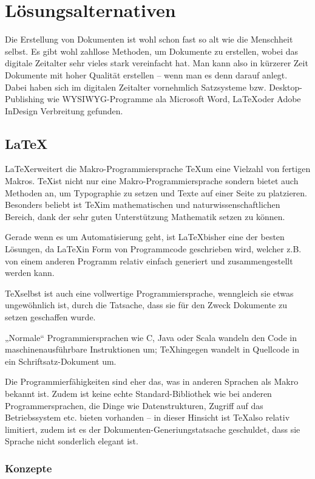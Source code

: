 \chapter{Lösungsalternativen}

Die Erstellung von Dokumenten ist wohl schon fast so alt wie die Menschheit
selbst. Es gibt wohl zahllose Methoden, um Dokumente zu erstellen, wobei
das digitale Zeitalter sehr vieles stark vereinfacht hat. Man kann also
in kürzerer Zeit Dokumente mit hoher Qualität erstellen -- wenn man es
denn darauf anlegt. Dabei haben sich im digitalen Zeitalter vornehmlich
Satzsysteme bzw. Desktop-Publishing wie WYSIWYG-Programme
ala Microsoft Word, \LaTeX oder Adobe InDesign Verbreitung gefunden.

\section{\LaTeX}

\LaTeX erweitert die Makro-Programmiersprache \TeX um eine Vielzahl von
fertigen Makros. \TeX ist nicht nur eine Makro-Programmiersprache sondern
bietet auch Methoden an, um Typographie zu setzen und Texte auf einer Seite
zu platzieren. Besonders beliebt ist \TeX im mathematischen und
naturwissenschaftlichen Bereich, dank der sehr guten Unterstützung Mathematik
setzen zu können.

Gerade wenn es um Automatisierung geht, ist \LaTeX bisher eine der besten
Lösungen, da \LaTeX in Form von Programmcode geschrieben wird, welcher
z.B. von einem anderen Programm relativ einfach generiert und zusammengestellt
werden kann.

\TeX selbst ist auch eine vollwertige Programmiersprache, wenngleich sie
etwas ungewöhnlich ist, durch die Tatsache, dass sie für den Zweck
Dokumente zu setzen geschaffen wurde.

„Normale“ Programmiersprachen wie C, Java oder Scala wandeln den Code in
maschinenausführbare Instruktionen um; \TeX hingegen wandelt in Quellcode
in ein Schriftsatz-Dokument um. %

Die Programmierfähigkeiten sind eher das, was in anderen Sprachen
als Makro bekannt ist. Zudem ist keine echte Standard-Bibliothek wie
bei anderen Programmersprachen, die Dinge wie Datenstrukturen, Zugriff auf
das Betriebssystem etc. bieten vorhanden -- in dieser Hinsicht ist \TeX also
relativ limitiert, zudem ist es der Dokumenten-Generiungstatsache geschuldet,
dass sie Sprache nicht sonderlich elegant ist.

\subsection{Konzepte}

